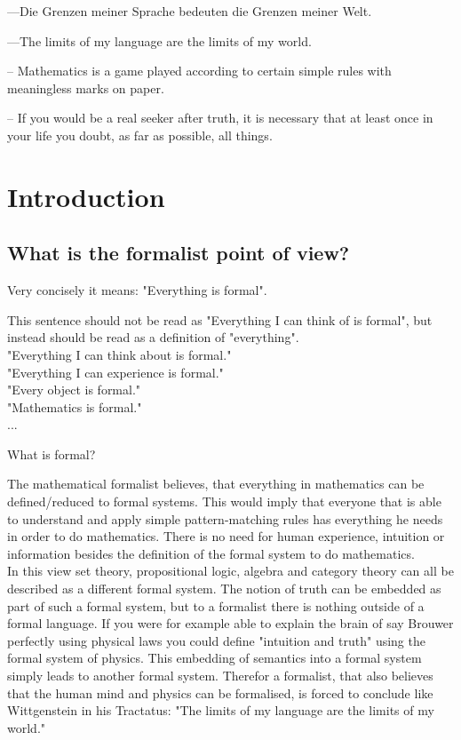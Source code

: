 \begin{savequote}
---Die Grenzen meiner Sprache bedeuten die Grenzen meiner Welt.

---The limits of my language are the limits of my world.

-- Mathematics is a game played according to certain simple rules with meaningless marks on paper. 

-- If you would be a real seeker after truth, it is necessary that at least once in your life you doubt, as far as possible, all things.
\end{savequote}


\chapter{Introduction}
\section{What is the formalist point of view?}
Very concisely it means: "Everything is formal".

This sentence should not be read as "Everything I can think of is formal", but instead should be read as a definition of "everything". \\

\noindent
"Everything I can think about is formal." \\
"Everything I can experience is formal." \\
"Every object is formal." \\
"Mathematics is formal." \\
...

What is formal?








The mathematical formalist believes, that everything in mathematics can be defined/reduced to formal systems. This would imply that everyone that is able to understand and apply simple pattern-matching rules has everything he needs in order to do mathematics. There is no need for human experience, intuition or information besides the definition of the formal system to do mathematics. \\

In this view set theory, propositional logic, algebra and category theory can all be described as a different formal system. The notion of truth can be embedded as part of such a formal system, but to a formalist there is nothing outside of a formal language.
If you were for example able to explain the brain of say Brouwer perfectly using physical laws you could define "intuition and truth" using the formal system of physics.
This embedding of semantics into a formal system simply leads to another formal system. Therefor a formalist, that also believes that the human mind and physics can be formalised, is forced to conclude like Wittgenstein in his Tractatus: "The limits of my language are the limits of my world."

